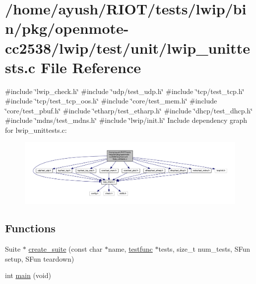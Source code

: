 \hypertarget{openmote-cc2538_2lwip_2test_2unit_2lwip__unittests_8c}{}\section{/home/ayush/\+R\+I\+O\+T/tests/lwip/bin/pkg/openmote-\/cc2538/lwip/test/unit/lwip\+\_\+unittests.c File Reference}
\label{openmote-cc2538_2lwip_2test_2unit_2lwip__unittests_8c}
{\ttfamily \#include \char`\"{}lwip\+\_\+check.\+h\char`\"{}}\newline
{\ttfamily \#include \char`\"{}udp/test\+\_\+udp.\+h\char`\"{}}\newline
{\ttfamily \#include \char`\"{}tcp/test\+\_\+tcp.\+h\char`\"{}}\newline
{\ttfamily \#include \char`\"{}tcp/test\+\_\+tcp\+\_\+oos.\+h\char`\"{}}\newline
{\ttfamily \#include \char`\"{}core/test\+\_\+mem.\+h\char`\"{}}\newline
{\ttfamily \#include \char`\"{}core/test\+\_\+pbuf.\+h\char`\"{}}\newline
{\ttfamily \#include \char`\"{}etharp/test\+\_\+etharp.\+h\char`\"{}}\newline
{\ttfamily \#include \char`\"{}dhcp/test\+\_\+dhcp.\+h\char`\"{}}\newline
{\ttfamily \#include \char`\"{}mdns/test\+\_\+mdns.\+h\char`\"{}}\newline
{\ttfamily \#include \char`\"{}lwip/init.\+h\char`\"{}}\newline
Include dependency graph for lwip\+\_\+unittests.\+c\+:
\nopagebreak
\begin{figure}[H]
\begin{center}
\leavevmode
\includegraphics[width=350pt]{openmote-cc2538_2lwip_2test_2unit_2lwip__unittests_8c__incl}
\end{center}
\end{figure}
\subsection*{Functions}
\begin{DoxyCompactItemize}
\item 
Suite $\ast$ \hyperlink{openmote-cc2538_2lwip_2test_2unit_2lwip__unittests_8c_a1087412a73ffe1f50078f13baf82d55c}{create\+\_\+suite} (const char $\ast$name, \hyperlink{structtestfunc}{testfunc} $\ast$tests, size\+\_\+t num\+\_\+tests, S\+Fun setup, S\+Fun teardown)
\item 
int \hyperlink{openmote-cc2538_2lwip_2test_2unit_2lwip__unittests_8c_a840291bc02cba5474a4cb46a9b9566fe}{main} (void)
\end{DoxyCompactItemize}


